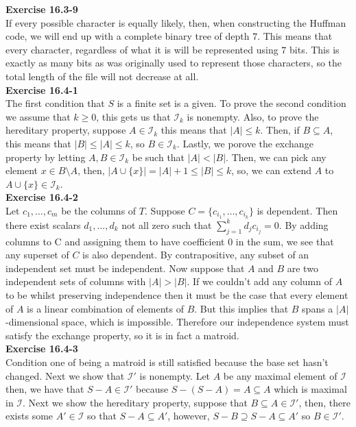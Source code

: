 \documentclass{article}
\begin{document}
\noindent\textbf{Exercise 16.3-9}\\

If every possible character is equally likely, then, when constructing the Huffman code, we will end up with a complete binary tree of depth $7$. This means that every character, regardless of what it is will be represented using $7$ bits. This is exactly as many bits as was originally used to represent those characters, so the total length of the file will not decrease at all.\\

\noindent\textbf{Exercise 16.4-1}\\

The first condition that $S$ is a finite set is a given. To prove the second condition we assume that $k\ge 0$, this gets us that $\mathcal{I}_k$ is nonempty. Also, to prove the hereditary property, suppose $A\in \mathcal{I}_k$ this means that $|A| \le k$. Then, if $B\subseteq A$, this means that $|B| \le |A| \le k$, so $B\in \mathcal{I}_k$. Lastly, we porove the exchange property by letting $A,B\in\mathcal{I}_k$ be such that $|A|<|B|$. Then, we can pick any element $x \in B\setminus A$, then, $|A\cup\{x\}|  = |A|+1 \le |B| \le k$, so, we can extend $A$ to $A\cup \{x\}\in \mathcal{I}_k$.\\

\noindent\textbf{Exercise 16.4-2}\\

Let $c_1, \ldots, c_m$ be the columns of $T$.  Suppose $C = \{c_{i_1}, \ldots, c_{i_k}\}$ is dependent.  Then there exist scalars $d_1, \ldots , d_k$ not all zero such that $\sum_{j=1}^k d_j c_{i_j} = 0$.  By adding columns to C and assigning them to have coefficient 0 in the sum, we see that any superset of $C$ is also dependent.  By contrapositive, any subset of an independent set must be independent.  Now suppose that $A$ and $B$ are two independent sets of columns with $|A| > |B|$.  If we couldn't add any column of $A$ to be whilst preserving independence then it must be the case that every element of $A$ is a linear combination of elements of $B$.  But this implies that $B$ spans a $|A|$-dimensional space, which is impossible.  Therefore our independence system must satisfy the exchange property, so it is in fact a matroid. \\

\noindent\textbf{Exercise 16.4-3}\\

Condition one of being a matroid is still satisfied because the base set hasn't changed. Next we show that $\mathcal{I}'$ is nonempty. Let $A$ be any maximal element of $\mathcal{I}$ then, we have that $S - A \in \mathcal{I}'$ because $S - (S-A) = A\subseteq A$ which is maximal in $\mathcal{I}$. Next we show the hereditary property, suppose that $B \subseteq A \in \mathcal{I}'$, then, there exists some $A'\in\mathcal{I}$ so that $S - A \subseteq A'$, however, $S-B \supseteq S-A \subseteq A'$ so $B\in \mathcal{I}'$.
\end{document}
